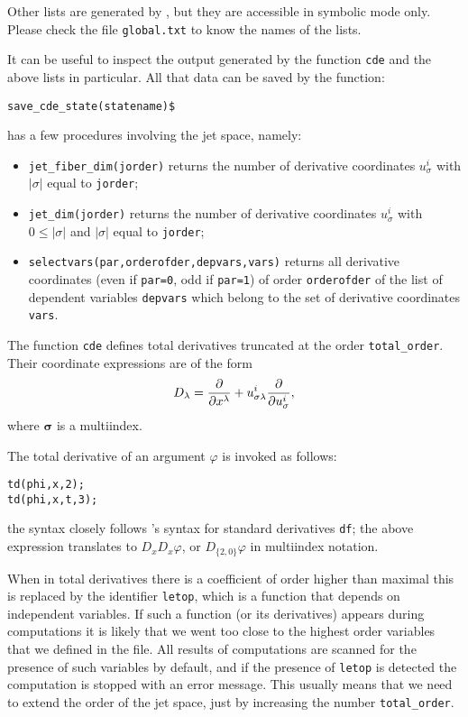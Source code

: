 Other lists are generated by \cde, but they are accessible in
\REDUCE symbolic mode only. Please check the file \texttt{global.txt} to know
the names of the lists.

It can be useful to inspect the output generated by the function \texttt{cde}
and the above lists in particular.  All that data can be saved by the function:
\begin{verbatim}
save_cde_state(statename)$
\end{verbatim}

\cde has a few procedures involving the jet space, namely:
\begin{itemize}
\item \texttt{jet\_fiber\_dim(jorder)} returns the number of derivative
  coordinates $u^i_\sigma$ with $|\sigma|$ equal to \texttt{jorder};
\item \texttt{jet\_dim(jorder)} returns the number of derivative
  coordinates $u^i_\sigma$ with $0\leq|\sigma|$ and $|\sigma|$ equal to
  \texttt{jorder};
\item \texttt{selectvars(par,orderofder,depvars,vars)} returns all derivative
  coordinates (even if \texttt{par=0}, odd if \texttt{par=1}) of order
  \texttt{orderofder} of the list of dependent variables \texttt{depvars} which
  belong to the set of derivative coordinates \texttt{vars}.
\end{itemize}

The function \texttt{cde} defines total derivatives truncated at the order
\texttt{total\_order}. Their coordinate
expressions are of the form
\begin{equation}
  \label{cdeeq:2}
  D_\lambda=\pd{}{x^\lambda} +
  u^i_{\mathbf{\sigma}\lambda}\pd{}{u^i_{\mathbf{\sigma}}},
\end{equation}
where $\mathbf{\sigma}$ is a multiindex.

The total derivative of an argument $\varphi$ is invoked as follows:
\begin{verbatim}
td(phi,x,2);
td(phi,x,t,3);
\end{verbatim}
the syntax closely follows \REDUCE's syntax for standard derivatives
\texttt{df}; the above expression translates to $D_xD_x\varphi$, or
$D_{\{2,0\}}\varphi$ in multiindex notation.

When in total derivatives there is a coefficient of order higher than maximal
this is replaced by the identifier \texttt{letop}, which is a function that
depends on independent variables. If such a function (or its derivatives)
appears during computations it is likely that we went too close to the highest
order variables that we defined in the file. All results of computations are
scanned for the presence of such variables by default, and if the presence of
\texttt{letop} is detected the computation is stopped with an error
message. This usually means that we need to extend the order of the jet space,
just by increasing the number \texttt{total\_order}.

